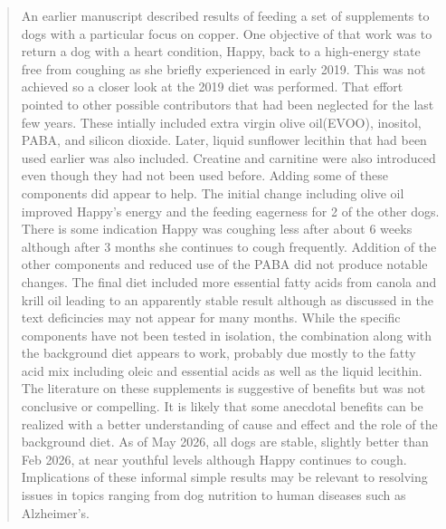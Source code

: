 \begin{abstract}
An earlier  manuscript \cite{marchywka-MJM-2024-010-0.01rg}
described results of feeding a set of supplements to dogs with
a particular focus on copper. One objective of that work
was to return a dog with a heart condition, Happy, back to a
high-energy state free from coughing as she briefly experienced 
in early 2019. This was not achieved so a closer look at the 2019
diet was performed. That effort pointed to other possible contributors 
that had been neglected
for the last few years. These intially included extra virgin olive oil(EVOO), 
inositol, PABA, and silicon dioxide. 
Later, liquid sunflower lecithin that had been used earlier was also
included. Creatine and carnitine were also introduced even though
they  had not been used before.
Adding some of these components did appear to help.
The initial change including olive oil improved Happy's energy and the  
feeding eagerness for 2 of the other dogs. There is some indication Happy 
was  coughing less after about 6 weeks although after 3 months
she continues to cough frequently.  
Addition of the other components and reduced use of the PABA 
did not produce notable changes. 
The final diet included more essential fatty acids from canola and
krill oil leading to an apparently stable result although as discussed
in the text deficincies may not appear for many months. 
While the specific components have not been tested in isolation, 
the combination along with the background diet 
appears to work,  probably due mostly to the fatty acid mix including
oleic and essential acids as well as the  liquid lecithin. 
The literature on these supplements is suggestive of benefits
but was not conclusive or compelling. It is likely that some
anecdotal benefits can be realized with a 
better  understanding of cause and effect and the role
of the background diet. As of May 2026, all dogs are stable,
slightly better than Feb 2026, at
near youthful levels although Happy continues to cough. 
Implications of these informal simple results may be relevant to resolving
issues in topics ranging  
from dog nutrition to human diseases such as Alzheimer's. 

\end{abstract}
\maketitle
\tableofcontents

